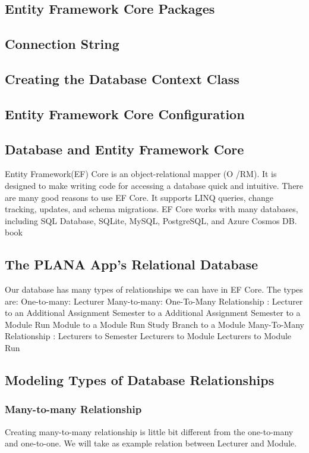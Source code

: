 \documentclass{scrartcl}
\begin{document}
\subsection{Entity Framework Core Packages}

\subsection{Connection String}

\subsection{Creating the Database Context Class}

\subsection{Entity Framework Core Configuration}

\subsection{Database and Entity Framework Core}
Entity Framework(EF) Core is an object-relational mapper (O /RM). It is designed to make writing code for accessing a database quick and intuitive.
There are many good reasons to use EF Core. It supports LINQ queries, change tracking, updates, and schema migrations. EF Core works with many databases, including SQL Database, SQLite, MySQL, PostgreSQL, and Azure Cosmos DB.
book \cite{efa} \cite{ef}

\subsection{The PLANA App's Relational Database}
Our database has many types of relationships we can have in EF Core. The types are:
One-to-many: Lecturer
Many-to-many:
One-To-Many Relationship : 
Lecturer to an Additional Assignment 
Semester to a Additional Assignment
Semester to a Module Run 
Module to a Module Run
Study Branch to a Module
Many-To-Many Relationship :
Lecturers to Semester
Lecturers to Module
Lecturers to Module Run




\subsection{Modeling Types of Database Relationships}
\subsubsection{Many-to-many Relationship }
Creating many-to-many relationship is little bit different from the one-to-many and one-to-one.
We will take as example relation between Lecturer and Module.\\
\end{document}
